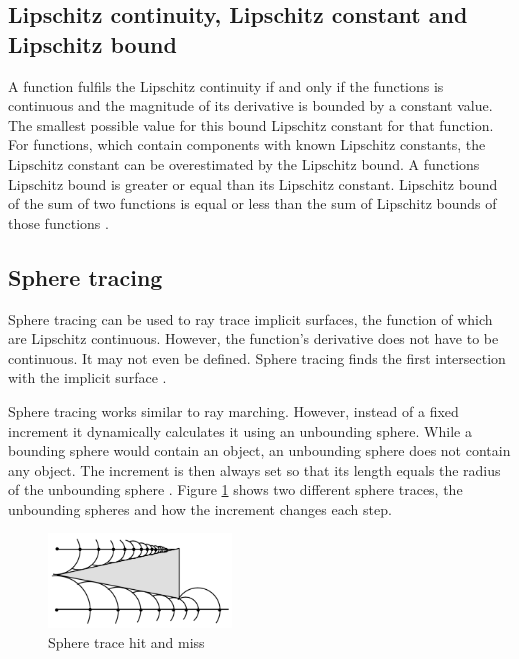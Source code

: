 \subsection{Lipschitz continuity, Lipschitz constant and Lipschitz bound}
A function fulfils the Lipschitz continuity if and only if the functions is continuous and the magnitude of its derivative is bounded by a constant value. The smallest possible value for this bound Lipschitz constant for that function. For functions, which contain components with known Lipschitz constants, the Lipschitz constant can be overestimated by the Lipschitz bound. A functions Lipschitz bound is greater or equal than its Lipschitz constant. Lipschitz bound of the sum of two functions is equal or less than the sum of Lipschitz bounds of those functions 
\cite{hart:1996:sphere} \cite{Heuser:2003}.

\subsection{Sphere tracing}

Sphere tracing can be used to ray trace implicit surfaces, the function of which are Lipschitz continuous. However, the function's derivative does not have to be continuous. It may not even be defined. Sphere tracing finds the first intersection with the implicit surface \cite{hart:1996:sphere}.

Sphere tracing works similar to ray marching. However, instead of a fixed increment it dynamically calculates it using an unbounding sphere. While a bounding sphere would contain an object, an unbounding sphere does not contain any object. The increment is then always set so that its length equals the radius of the unbounding sphere \cite{hart:1996:sphere}. 
Figure \ref{fig:sphere-trace} shows two different sphere traces, the unbounding spheres and how the increment changes each step.

\begin{figure}[!h]
	\begin{center}
	\includegraphics[height=2.5cm]{sphere-trace-hit-and-miss.png}
	\caption{Sphere trace hit and miss \cite{hart:1996:sphere}}
	\label{fig:sphere-trace}
	\end{center}
\end{figure}

